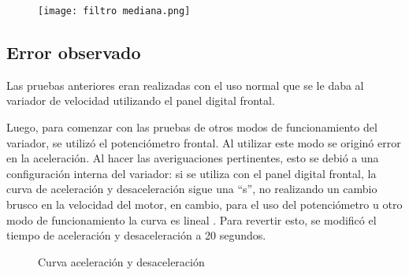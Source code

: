 \begin{figure}[htb]
	\centering
	\texttt{[image: filtro mediana.png]}
	\label{fig:filtrosm}
\end{figure}


\subsection{Error observado}
Las pruebas anteriores eran realizadas con el uso normal que se le daba al variador de velocidad utilizando el panel digital frontal.

Luego, para comenzar con las pruebas de otros modos de funcionamiento del variador, se utilizó el potenciómetro frontal. Al utilizar este modo se originó error en la aceleración.   Al hacer las averiguaciones pertinentes, esto se debió a una configuración interna del variador: si se utiliza con el panel digital frontal, la curva de aceleración y desaceleración sigue una “s”, no realizando un cambio brusco en la velocidad del motor, en cambio, para el uso del potenciómetro u otro modo de funcionamiento la curva es lineal . Para revertir esto, se modificó el tiempo de aceleración y desaceleración a 20 segundos.

\begin{figure}[htbp]
	\centering
	\caption{Curva aceleración y desaceleración} \label{fig:curva}
\end{figure}

\newpage